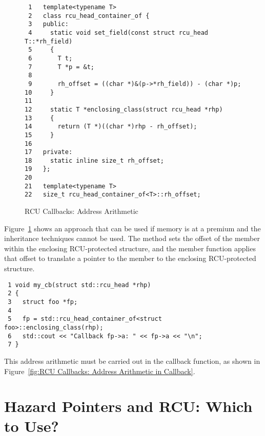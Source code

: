 \documentclass[letterpaper,twocolumn,10pt]{article}
\begin{document}
\begin{figure}[tbp]
{ \scriptsize
\begin{verbatim}
 1   template<typename T>
 2   class rcu_head_container_of {
 3   public:
 4     static void set_field(const struct rcu_head T::*rh_field)
 5     {
 6       T t;
 7       T *p = &t;
 8
 9       rh_offset = ((char *)&(p->*rh_field)) - (char *)p;
10     }
11
12     static T *enclosing_class(struct rcu_head *rhp)
13     {
14       return (T *)((char *)rhp - rh_offset);
15     }
16
17   private:
18     static inline size_t rh_offset;
19   };
20
21   template<typename T>
22   size_t rcu_head_container_of<T>::rh_offset;
\end{verbatim}
}
\caption{RCU Callbacks: Address Arithmetic}
\label{fig:RCU Callbacks: Address Arithmetic}
\end{figure}

Figure~\ref{fig:RCU Callbacks: Address Arithmetic}
shows an approach that can be used if memory is at a premium and
the inheritance techniques cannot be used.
The  method sets the offset of the
 member within the enclosing RCU-protected
structure, and the  member function
applies that offset to translate a pointer to the
 member to the enclosing RCU-protected structure.

\begin{figure*}[tbp]
{ \scriptsize
\begin{verbatim}
 1 void my_cb(struct std::rcu_head *rhp)
 2 {
 3   struct foo *fp;
 4
 5   fp = std::rcu_head_container_of<struct foo>::enclosing_class(rhp);
 6   std::cout << "Callback fp->a: " << fp->a << "\n";
 7 }
\end{verbatim}
}
\caption{RCU Callbacks: Address Arithmetic in Callback}
\label{fig:RCU Callbacks: Address Arithmetic in Callback}
\end{figure*}

This address arithmetic must be carried out in the callback function,
as shown in
Figure~\ref{fig:RCU Callbacks: Address Arithmetic in Callback}.

\section{Hazard Pointers and RCU: Which to Use?}
\label{sec:Hazard Pointers and RCU: Which to Use?}
\end{document}
